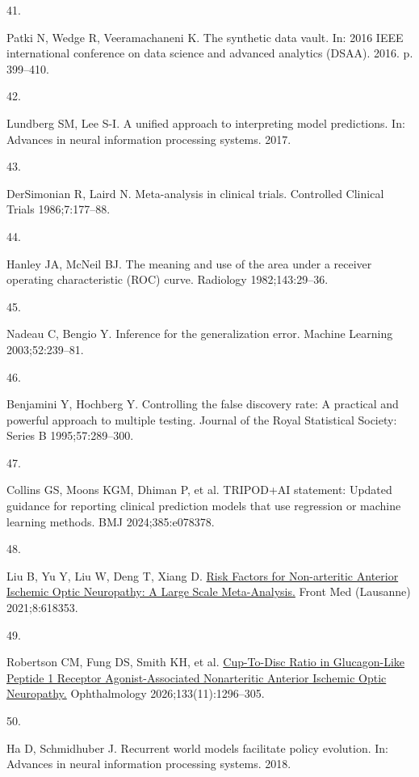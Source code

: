 \documentclass[
  11pt,
]{article}
\newlength{\cslhangindent}
\newlength{\csllabelwidth}
\newenvironment{CSLReferences}[2] %
 {\begin{list}{}{%
  \setlength{\itemindent}{0pt}
  \setlength{\leftmargin}{0pt}
  \setlength{\parsep}{0pt}
  \ifodd #1
   \setlength{\leftmargin}{\cslhangindent}
   \setlength{\itemindent}{-1\cslhangindent}
  \fi
  \setlength{\itemsep}{#2\baselineskip}}}
 {\end{list}}
\newcommand{\CSLLeftMargin}[1]{\parbox[t]{\csllabelwidth}{\strut#1\strut}}
\newcommand{\CSLRightInline}[1]{\parbox[t]{\linewidth - \csllabelwidth}{\strut#1\strut}}
\begin{document}
\begin{CSLReferences}{0}{1}
\CSLLeftMargin{41. }%
\CSLRightInline{Patki N, Wedge R, Veeramachaneni K. The synthetic data
vault. In: 2016 IEEE international conference on data science and
advanced analytics (DSAA). 2016. p. 399--410.}

\CSLLeftMargin{42. }%
\CSLRightInline{Lundberg SM, Lee S-I. A unified approach to interpreting
model predictions. In: Advances in neural information processing
systems. 2017. }

\CSLLeftMargin{43. }%
\CSLRightInline{DerSimonian R, Laird N. Meta-analysis in clinical
trials. Controlled Clinical Trials 1986;7:177--88. }

\CSLLeftMargin{44. }%
\CSLRightInline{Hanley JA, McNeil BJ. The meaning and use of the area
under a receiver operating characteristic (ROC) curve. Radiology
1982;143:29--36. }

\CSLLeftMargin{45. }%
\CSLRightInline{Nadeau C, Bengio Y. Inference for the generalization
error. Machine Learning 2003;52:239--81. }

\CSLLeftMargin{46. }%
\CSLRightInline{Benjamini Y, Hochberg Y. Controlling the false discovery
rate: A practical and powerful approach to multiple testing. Journal of
the Royal Statistical Society: Series B 1995;57:289--300. }

\CSLLeftMargin{47. }%
\CSLRightInline{Collins GS, Moons KGM, Dhiman P, et al. TRIPOD+AI
statement: Updated guidance for reporting clinical prediction models
that use regression or machine learning methods. BMJ 2024;385:e078378. }

\CSLLeftMargin{48. }%
\CSLRightInline{Liu B, Yu Y, Liu W, Deng T, Xiang D.
\href{https://doi.org/10.3389/fmed.2021.618353}{{Risk Factors for
Non-arteritic Anterior Ischemic Optic Neuropathy: A Large Scale
Meta-Analysis.}} Front Med (Lausanne) 2021;8:618353. }

\CSLLeftMargin{49. }%
\CSLRightInline{Robertson CM, Fung DS, Smith KH, et al.
\href{https://doi.org/10.1016/j.ophtha.2026.07.036}{{Cup-To-Disc Ratio
in Glucagon-Like Peptide 1 Receptor Agonist-Associated Nonarteritic
Anterior Ischemic Optic Neuropathy.}} Ophthalmology
2026;133(11):1296--305. }

\CSLLeftMargin{50. }%
\CSLRightInline{Ha D, Schmidhuber J. Recurrent world models facilitate
policy evolution. In: Advances in neural information processing systems.
2018. }


\end{CSLReferences}
\end{document}
